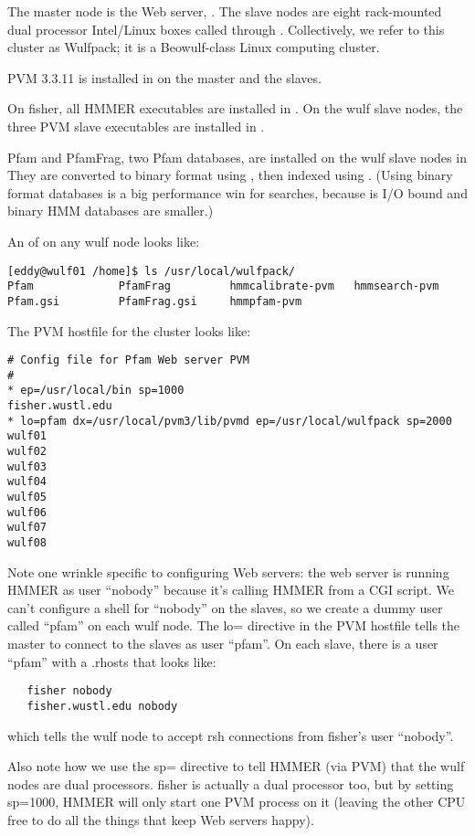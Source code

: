 The master node is the Web server, . The slave nodes are
eight rack-mounted dual processor Intel/Linux boxes called
 through . Collectively, we refer to
this cluster as Wulfpack; it is a Beowulf-class Linux computing
cluster.

PVM 3.3.11 is installed in  on the master and the
slaves. 

On fisher, all HMMER executables are installed in
.  On the wulf slave nodes, the three PVM slave
executables are installed in
.

Pfam and PfamFrag, two Pfam databases, are installed on the wulf slave
nodes in  They are converted to binary
format using , then indexed using .
(Using binary format databases is a big performance win for
 searches, because  is I/O bound and  
binary HMM databases are smaller.)

An  of  on any wulf node looks like:
\begin{verbatim}
[eddy@wulf01 /home]$ ls /usr/local/wulfpack/
Pfam             PfamFrag         hmmcalibrate-pvm   hmmsearch-pvm
Pfam.gsi         PfamFrag.gsi     hmmpfam-pvm
\end{verbatim}

The PVM hostfile for the cluster looks like:
\begin{verbatim}
# Config file for Pfam Web server PVM
#
* ep=/usr/local/bin sp=1000
fisher.wustl.edu
* lo=pfam dx=/usr/local/pvm3/lib/pvmd ep=/usr/local/wulfpack sp=2000
wulf01
wulf02
wulf03
wulf04
wulf05
wulf06
wulf07
wulf08
\end{verbatim}

Note one wrinkle specific to configuring Web servers: the web server
is running HMMER as user ``nobody'' because it's calling HMMER from a
CGI script. We can't configure a shell for ``nobody'' on the slaves,
so we create a dummy user called ``pfam'' on each wulf node.  The lo=
directive in the PVM hostfile tells the master to connect to the
slaves as user ``pfam''. On each slave, there is a user ``pfam'' with
a .rhosts that looks like:
\begin{verbatim}
   fisher nobody
   fisher.wustl.edu nobody
\end{verbatim}
which tells the wulf node to accept rsh connections from
fisher's user ``nobody''.

Also note how we use the sp= directive to tell HMMER (via PVM) that
the wulf nodes are dual processors. fisher is actually a dual
processor too, but by setting sp=1000, HMMER will only start one PVM
process on it (leaving the other CPU free to do all the things that
keep Web servers happy).

